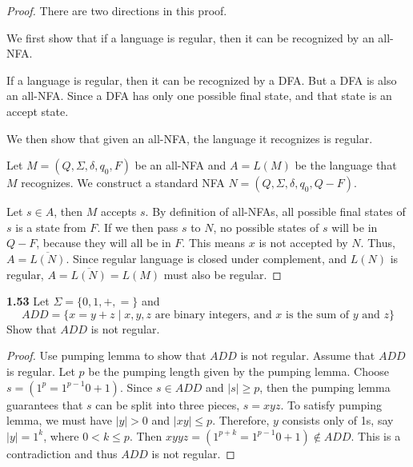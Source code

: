 \begin{mdframed}
\begin{proof}
There are two directions in this proof.

\medskip
We first show that if a language is regular, then it can be recognized by an all-NFA.

If a language is regular, then it can be recognized by a DFA. But a DFA is also an all-NFA. Since a DFA has only one possible final state, and that state is an accept state.


\medskip 
We then show that given an all-NFA, the language it recognizes is regular.

Let $M = (Q, \Sigma, \delta, q_0, F)$ be an all-NFA and $A = L(M)$ be the language that $M$ recognizes. We construct a standard NFA $N = (Q, \Sigma, \delta, q_0, Q - F)$. 

Let $s \in A$, then $M$ accepts $s$. By definition of all-NFAs, all possible final states of $s$ is a state from $F$. If we then pass $s$ to $N$, no possible states of $s$ will be in $Q - F$, because they will all be in $F$. This means $x$ is not accepted by $N$. Thus, $A = \overline{L(N)}$. Since regular language is closed under complement, and $L(N)$ is regular, $A = \overline{L(N)} = L(M)$ must also be regular.
\end{proof}
\end{mdframed}

\textbf{1.53} Let $\Sigma = \{0, 1, +, = \}$ and 
\[
ADD = \{x = y+z  \mid x, y, z \text{ are binary integers, and $x$ is the sum of $y$ and $z$}\}
\]
Show that $ADD$ is not regular.

\begin{mdframed}
\begin{proof}
Use pumping lemma to show that $ADD$ is not regular. Assume that $ADD$ is regular. Let $p$ be the pumping length given by the pumping lemma. Choose $s = (1^p = 1^{p-1}0 + 1)$. Since $s \in ADD$ and $|s| \geq p$, then the pumping lemma guarantees that $s$ can be split into three pieces, $s= xyz$. To satisfy pumping lemma, we must have $|y| > 0$ and $|xy| \leq p$. Therefore, $y$ consists only of 1s, say $|y| = 1^k$, where $0 < k \leq p$. Then $xyyz = (1^{p+k} = 1^{p-1}0 + 1) \not \in ADD$. This is a contradiction and thus $ADD$ is not regular.
\end{proof}
\end{mdframed}